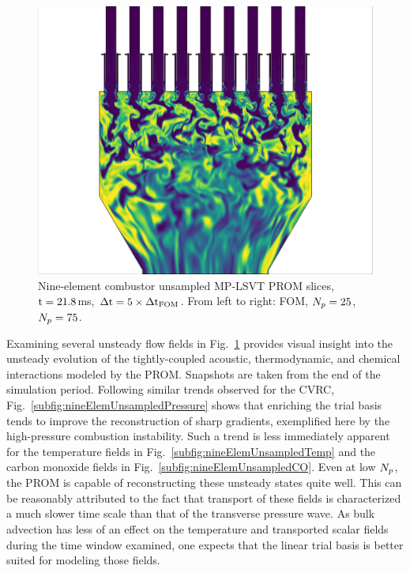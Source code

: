 \begin{figure}
{\begin{minipage}{0.32\linewidth}
		\includegraphics[width=0.99\linewidth,trim={0.5em 0.5em 15.0em 0.5em},clip]{Chapters/HPROMResults/Images/nineElem/unsampled/rom_k75_co_z.png}
	\end{minipage}
	}

	\caption{\label{fig:nineElemUnsampledContours}Nine-element combustor unsampled MP-LSVT PROM slices, $\text{t} = 21.8$ms, $\Delta \text{t} = 5 \times \Delta \text{t}_{\text{FOM}}$. From left to right: FOM, $N_p=25$, $N_p=75$.}
\end{figure}

Examining several unsteady flow fields in Fig.~\ref{fig:nineElemUnsampledContours} provides visual insight into the unsteady evolution of the tightly-coupled acoustic, thermodynamic, and chemical interactions modeled by the PROM. Snapshots are taken from the end of the simulation period. Following similar trends observed for the CVRC, Fig.~\ref{subfig:nineElemUnsampledPressure} shows that enriching the trial basis tends to improve the reconstruction of sharp gradients, exemplified here by the high-pressure combustion instability. Such a trend is less immediately apparent for the temperature fields in Fig.~\ref{subfig:nineElemUnsampledTemp} and the carbon monoxide fields in Fig.~\ref{subfig:nineElemUnsampledCO}. Even at low $N_p$, the PROM is capable of reconstructing these unsteady states quite well. This can be reasonably attributed to the fact that transport of these fields is characterized a much slower time scale than that of the transverse pressure wave. As bulk advection has less of an effect on the temperature and transported scalar fields during the time window examined, one expects that the linear trial basis is better suited for modeling those fields.

